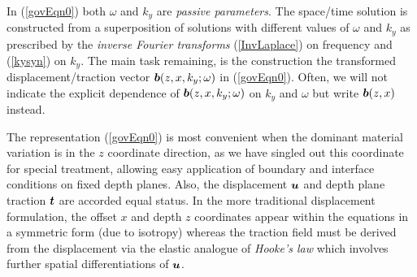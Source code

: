In (\ref{govEqn0}) both $\omega$ and ${  k}_{  y}$ are {\em passive 
parameters\/}. The space/time solution is constructed from a 
superposition of solutions with different values of $\omega$ and ${  k}_{  y}$
as prescribed by the {\em inverse Fourier transforms\/} 
(\ref{InvLaplace}) on frequency and 
(\ref{kysyn}) on $k_y$. The main task remaining, is the construction the 
transformed displacement/traction vector ${\mbox{\boldmath$\mit b$\unboldmath} }(z,x,k_y; \omega)$ in (\ref{govEqn0}). 
Often, we will not indicate the explicit dependence of  ${\mbox{\boldmath$\mit b$\unboldmath} }(z,x,k_y; \omega)$ 
on $k_y$ and $\omega$ but write ${\mbox{\boldmath$\mit b$\unboldmath} }(z,x)$ instead.

The representation (\ref{govEqn0}) is most convenient when the
dominant material variation is in the $z$ coordinate direction, as we have
singled out this coordinate for special treatment, allowing easy application of
boundary and interface conditions on fixed depth planes.  Also, the
displacement ${\mbox{\boldmath$\mit u$\unboldmath}}$ and depth plane traction ${\mbox{\boldmath$\mit t$\unboldmath}}$ are accorded equal status.
In the more traditional displacement formulation, the  offset $x$ and depth $z$
coordinates appear within the equations in a symmetric form (due to isotropy)
whereas the traction field must be derived from the displacement via the
elastic analogue of {\em Hooke's law\/} which involves further spatial
differentiations of $\mbox{\boldmath$\mit u$\unboldmath}$.



